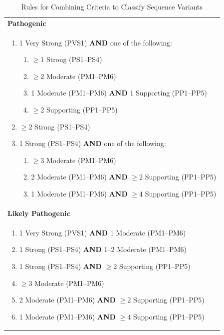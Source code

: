 \documentclass[../main.tex]{subfiles}
\begin{document}
\begin{table}[h!]
\centering
\caption{Rules for Combining Criteria to Classify Sequence Variants}
\label{tab:acmg_rules_populated}
\begin{tabular}{p{}} %
\toprule
\textbf{Pathogenic} \\
\begin{enumerate}[label=\arabic*., wide, labelindent=0pt, topsep=2pt, itemsep=1pt]
    \item 1 Very Strong (PVS1) \textbf{AND} one of the following:
    \begin{enumerate}[label=(\alph*), leftmargin=*, topsep=1pt]
        \item $\ge$1 Strong (PS1--PS4)
        \item $\ge$2 Moderate (PM1--PM6)
        \item 1 Moderate (PM1--PM6) \textbf{AND} 1 Supporting (PP1--PP5)
        \item $\ge$2 Supporting (PP1--PP5)
    \end{enumerate}
    \item $\ge$2 Strong (PS1--PS4)
    \item 1 Strong (PS1--PS4) \textbf{AND} one of the following:
    \begin{enumerate}[label=(\alph*), leftmargin=*, topsep=1pt]
        \item $\ge$3 Moderate (PM1--PM6)
        \item 2 Moderate (PM1--PM6) \textbf{AND} $\ge$2 Supporting (PP1--PP5)
        \item 1 Moderate (PM1--PM6) \textbf{AND} $\ge$4 Supporting (PP1--PP5)
    \end{enumerate}
\end{enumerate}
\vspace{0.5em} \\ 
\midrule

\textbf{Likely Pathogenic} \\
\begin{enumerate}[label=\arabic*., wide, labelindent=0pt, topsep=2pt, itemsep=1pt]
    \item 1 Very Strong (PVS1) \textbf{AND} 1 Moderate (PM1--PM6)
    \item 1 Strong (PS1--PS4) \textbf{AND} 1--2 Moderate (PM1--PM6)
    \item 1 Strong (PS1--PS4) \textbf{AND} $\ge$2 Supporting (PP1--PP5)
    \item $\ge$3 Moderate (PM1--PM6)
    \item 2 Moderate (PM1--PM6) \textbf{AND} $\ge$2 Supporting (PP1--PP5)
    \item 1 Moderate (PM1--PM6) \textbf{AND} $\ge$4 Supporting (PP1--PP5)
\end{enumerate}
\vspace{0.5em} \\
\midrule


\end{tabular}
\end{table}
\end{document}
